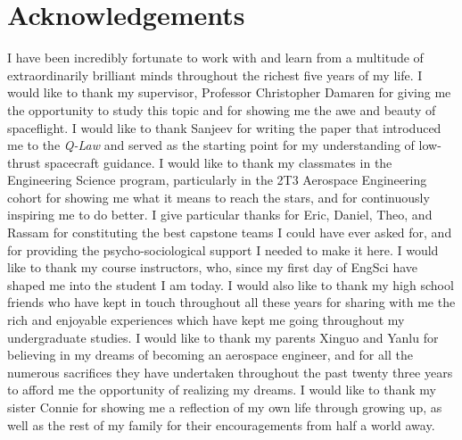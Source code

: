 \newpage
\vspace*{\fill}
\section*{Acknowledgements}
I have been incredibly fortunate to work with and learn from a multitude of extraordinarily brilliant minds throughout the richest five years of my life. I would like to thank my supervisor, Professor Christopher Damaren for giving me the opportunity to study this topic and for showing me the awe and beauty of spaceflight. I would like to thank Sanjeev for writing the paper that introduced me to the \textit{Q-Law} and served as the starting point for my understanding of low-thrust spacecraft guidance. I would like to thank my classmates in the Engineering Science program, particularly in the 2T3 Aerospace Engineering cohort for showing me what it means to reach the stars, and for continuously inspiring me to do better. I give particular thanks for Eric, Daniel, Theo, and Rassam for constituting the best capstone teams I could have ever asked for, and for providing the psycho-sociological support I needed to make it here. I would like to thank my course instructors, who, since my first day of EngSci have shaped me into the student I am today. I would also like to thank my high school friends who have kept in touch throughout all these years for sharing with me the rich and enjoyable experiences which have kept me going throughout my undergraduate studies. I would like to thank my parents Xinguo and Yanlu for believing in my dreams of becoming an aerospace engineer, and for all the numerous sacrifices they have undertaken throughout the past twenty three years to afford me the opportunity of realizing my dreams. I would like to thank my sister Connie for showing me a reflection of my own life through growing up, as well as the rest of my family for their encouragements from half a world away.
\vspace*{\fill}


\tableofcontents
\listoffigures
\listoftables